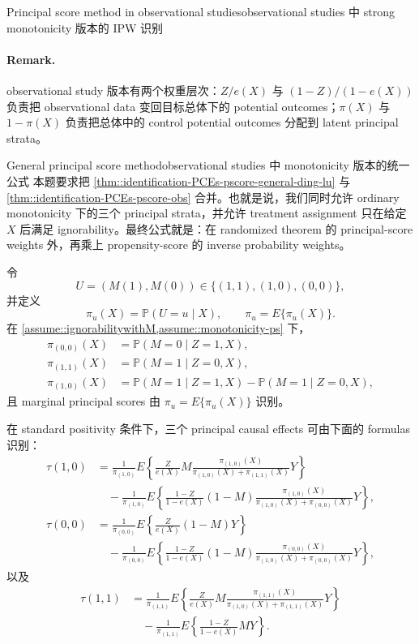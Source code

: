 \begin{exercisesolution}{Principal score method in observational studies}{observational studies 中 strong monotonicity 版本的 IPW 识别}
\paragraph{Remark.}
observational study 版本有两个权重层次：$Z/e(X)$ 与 $(1-Z)/(1-e(X))$ 负责把 observational data 变回目标总体下的 potential outcomes；$\pi(X)$ 与 $1-\pi(X)$ 负责把总体中的 control potential outcomes 分配到 latent principal strata。
\end{exercisesolution}

\begin{exercisesolution}{General principal score method}{observational studies 中 monotonicity 版本的统一公式}
本题要求把 \cref{thm::identification-PCEs-pscore-general-ding-lu} 与 \cref{thm::identification-PCEs-pscore-obs} 合并。也就是说，我们同时允许 ordinary monotonicity 下的三个 principal strata，并允许 treatment assignment 只在给定 $X$ 后满足 ignorability。最终公式就是：在 randomized theorem 的 principal-score weights 外，再乘上 propensity-score 的 inverse probability weights。

令
\[
U=(M(1),M(0))\in\{(1,1),(1,0),(0,0)\},
\]
并定义
\[
\pi_u(X)=\mathbb{P}(U=u\mid X),
\qquad
\pi_u=E\{\pi_u(X)\}.
\]
在 \cref{assume::ignorabilitywithM,assume::monotonicity-ps} 下，
\begin{align*}
\pi_{(0,0)}(X)&=\mathbb{P}(M=0\mid Z=1,X),\\
\pi_{(1,1)}(X)&=\mathbb{P}(M=1\mid Z=0,X),\\
\pi_{(1,0)}(X)&=\mathbb{P}(M=1\mid Z=1,X)-\mathbb{P}(M=1\mid Z=0,X),
\end{align*}
且 marginal principal scores 由 $\pi_u=E\{\pi_u(X)\}$ 识别。

在 standard positivity 条件下，三个 principal causal effects 可由下面的 formulas 识别：
\begin{align*}
\tau(1,0)
&=
\frac{1}{\pi_{(1,0)}}E\left\{
\frac{Z}{e(X)}M
\frac{\pi_{(1,0)}(X)}{\pi_{(1,0)}(X)+\pi_{(1,1)}(X)}
Y\right\}\\
&\quad -
\frac{1}{\pi_{(1,0)}}E\left\{
\frac{1-Z}{1-e(X)}(1-M)
\frac{\pi_{(1,0)}(X)}{\pi_{(1,0)}(X)+\pi_{(0,0)}(X)}
Y\right\},
\end{align*}
\begin{align*}
\tau(0,0)
&=
\frac{1}{\pi_{(0,0)}}E\left\{
\frac{Z}{e(X)}(1-M)Y\right\}\\
&\quad -
\frac{1}{\pi_{(0,0)}}E\left\{
\frac{1-Z}{1-e(X)}(1-M)
\frac{\pi_{(0,0)}(X)}{\pi_{(1,0)}(X)+\pi_{(0,0)}(X)}
Y\right\},
\end{align*}
以及
\begin{align*}
\tau(1,1)
&=
\frac{1}{\pi_{(1,1)}}E\left\{
\frac{Z}{e(X)}M
\frac{\pi_{(1,1)}(X)}{\pi_{(1,0)}(X)+\pi_{(1,1)}(X)}
Y\right\}\\
&\quad -
\frac{1}{\pi_{(1,1)}}E\left\{
\frac{1-Z}{1-e(X)}MY\right\}.
\end{align*}


\end{exercisesolution}
